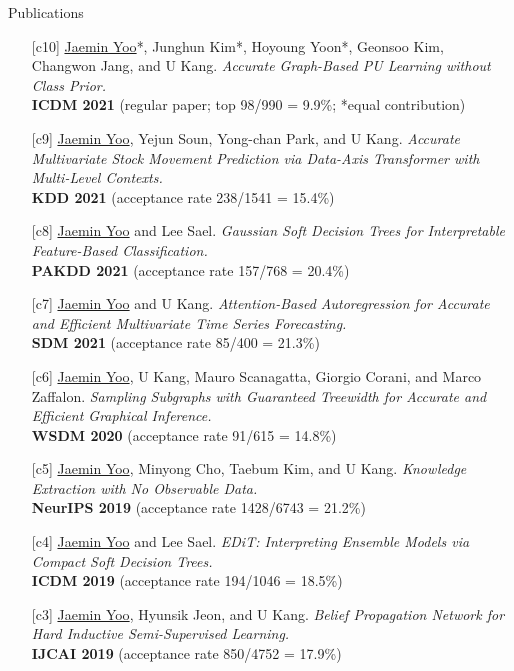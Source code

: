 \documentclass{resume} %
\begin{document}
\begin{rSection}{Publications}
\smallskip
\begin{enumerate}

	\item[{[c10]}] \underline{Jaemin Yoo}*, Junghun Kim*, Hoyoung Yoon*, Geonsoo Kim, Changwon Jang, and U Kang.
		\emph{Accurate Graph-Based PU Learning without Class Prior.} \\
		\textbf{ICDM 2021} (regular paper; top 98/990 = 9.9\%; *equal contribution)

	\item[{[c9]}] \underline{Jaemin Yoo}, Yejun Soun, Yong-chan Park, and U Kang.
		\emph{Accurate Multivariate Stock Movement Prediction via Data-Axis Transformer with Multi-Level Contexts.} \\
		\textbf{KDD 2021} (acceptance rate 238/1541 = 15.4\%)

	\item[{[c8]}] \underline{Jaemin Yoo} and Lee Sael.
		\emph{Gaussian Soft Decision Trees for Interpretable Feature-Based Classification.} \\
		\textbf{PAKDD 2021} (acceptance rate 157/768 = 20.4\%)
		
	\item[{[c7]}] \underline{Jaemin Yoo} and U Kang.
		\emph{Attention-Based Autoregression for Accurate and Efficient Multivariate Time Series Forecasting.} \\
		\textbf{SDM 2021} (acceptance rate 85/400 = 21.3\%)

	\item[{[c6]}] \underline{Jaemin Yoo}, U Kang, Mauro Scanagatta, Giorgio Corani, and Marco Zaffalon.
		\emph{Sampling Subgraphs with Guaranteed Treewidth for Accurate and Efficient Graphical Inference.} \\
		\textbf{WSDM 2020} (acceptance rate 91/615 = 14.8\%)

	\item[{[c5]}] \underline{Jaemin Yoo}, Minyong Cho, Taebum Kim, and U Kang.
		\emph{Knowledge Extraction with No Observable Data.} \\
		\textbf{NeurIPS 2019} (acceptance rate 1428/6743 = 21.2\%)

	\item[{[c4]}] \underline{Jaemin Yoo} and Lee Sael.
		\emph{EDiT: Interpreting Ensemble Models via Compact Soft Decision Trees.} \\
		\textbf{ICDM 2019} (acceptance rate 194/1046 = 18.5\%)

	\item[{[c3]}] \underline{Jaemin Yoo}, Hyunsik Jeon, and U Kang.
		\emph{Belief Propagation Network for Hard Inductive Semi-Supervised Learning.} \\
		\textbf{IJCAI 2019} (acceptance rate 850/4752 = 17.9\%)


\end{enumerate}
\end{rSection}
\end{document}
